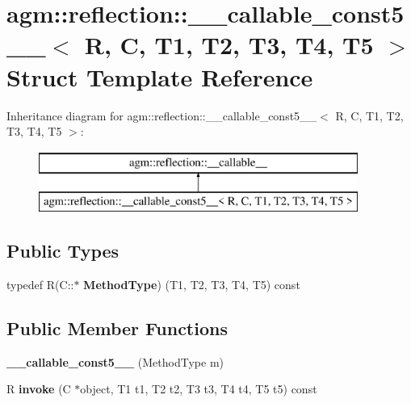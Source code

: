 \hypertarget{structagm_1_1reflection_1_1____callable__const5____}{}\section{agm\+:\+:reflection\+:\+:\+\_\+\+\_\+callable\+\_\+const5\+\_\+\+\_\+$<$ R, C, T1, T2, T3, T4, T5 $>$ Struct Template Reference}
\label{structagm_1_1reflection_1_1____callable__const5____}
Inheritance diagram for agm\+:\+:reflection\+:\+:\+\_\+\+\_\+callable\+\_\+const5\+\_\+\+\_\+$<$ R, C, T1, T2, T3, T4, T5 $>$\+:\begin{figure}[H]
\begin{center}
\leavevmode
\includegraphics[height=2.000000cm]{structagm_1_1reflection_1_1____callable__const5____}
\end{center}
\end{figure}
\subsection*{Public Types}
\begin{DoxyCompactItemize}
\item 
typedef R(C\+::$\ast$ {\bfseries Method\+Type}) (T1, T2, T3, T4, T5) const \hypertarget{structagm_1_1reflection_1_1____callable__const5_____ae5704cfead52ed939fa9e3ca9dd9dc74}{}\label{structagm_1_1reflection_1_1____callable__const5_____ae5704cfead52ed939fa9e3ca9dd9dc74}

\end{DoxyCompactItemize}
\subsection*{Public Member Functions}
\begin{DoxyCompactItemize}
\item 
{\bfseries \+\_\+\+\_\+callable\+\_\+const5\+\_\+\+\_\+} (Method\+Type m)\hypertarget{structagm_1_1reflection_1_1____callable__const5_____acdea99eadae9fe14cb23fef6dce57c53}{}\label{structagm_1_1reflection_1_1____callable__const5_____acdea99eadae9fe14cb23fef6dce57c53}

\item 
R {\bfseries invoke} (C $\ast$object, T1 t1, T2 t2, T3 t3, T4 t4, T5 t5) const \hypertarget{structagm_1_1reflection_1_1____callable__const5_____a2e2be8c26cb17eb168c10f27b4665380}{}\label{structagm_1_1reflection_1_1____callable__const5_____a2e2be8c26cb17eb168c10f27b4665380}

\end{DoxyCompactItemize}
